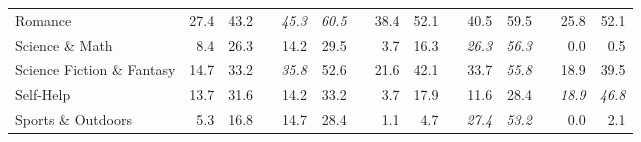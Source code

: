 \documentclass[12pt]{article}
\numberwithin{equation}{section}
\numberwithin{figure}{section}
\begin{document}
\begin{table}[]
{\begin{tabular}{lrrrrrrrrrrrrrr}
	Romance                        & 27.4                               & 43.2                               &                               & \textit{45.3}                      & \textit{60.5}                      &                               & 38.4                               & 52.1                               &                               & 40.5                               & 59.5                               &                               & 25.8                               & 52.1                               \\
	Science \& Math                & 8.4                                & 26.3                               &                               & 14.2                               & 29.5                               &                               & 3.7                                & 16.3                               &                               & \textit{26.3}                      & \textit{56.3}                      &                               & 0.0                                & 0.5                                \\
	Science Fiction \& Fantasy     & 14.7                               & 33.2                               &                               & \textit{35.8}                      & 52.6                               &                               & 21.6                               & 42.1                               &                               & 33.7                               & \textit{55.8}                      &                               & 18.9                               & 39.5                               \\
	Self-Help                      & 13.7                               & 31.6                               &                               & 14.2                               & 33.2                               &                               & 3.7                                & 17.9                               &                               & 11.6                               & 28.4                               &                               & \textit{18.9}                      & \textit{46.8}                      \\
	Sports \& Outdoors             & 5.3                                & 16.8                               &                               & 14.7                               & 28.4                               &                               & 1.1                                & 4.7                                &                               & \textit{27.4}                      & \textit{53.2}                      &                               & 0.0                                & 2.1                                \\

\end{tabular}}
\end{table}
\end{document}
